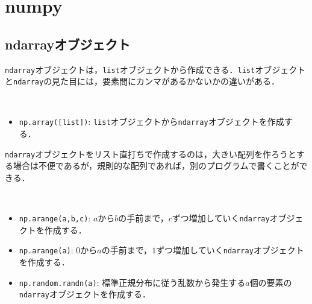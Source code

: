 \section{numpy}

\subsection{ndarrayオブジェクト}

\texttt{ndarray}オブジェクトは，\texttt{list}オブジェクトから作成できる．\texttt{list}オブジェクトと\texttt{ndarray}の見た目には，要素間にカンマがあるかないかの違いがある．

\begin{gram}　
\begin{itemize}
\item \texttt{np.array([list])}: \texttt{list}オブジェクトから\texttt{ndarray}オブジェクトを作成する．
\end{itemize}
\end{gram}

\begin{cod}[\texttt{num1.py}]　
}]{code/num1.py}
\vspace{-7pt}
\begin{lstlisting}
x=[1 2 3]
y=[4 5 6 7]
mylist=[4, 5, 6, 7]
\end{lstlisting}
\end{cod}
\vspace{-10pt}

\texttt{ndarray}オブジェクトをリスト直打ちで作成するのは，大きい配列を作ろうとする場合は不便であるが，規則的な配列であれば，別のプログラムで書くことができる．

\begin{gram}　
\begin{itemize}
\item \texttt{np.arange(a,b,c)}: $a$から$b$の手前まで，$c$ずつ増加していく\texttt{ndarray}オブジェクトを作成する．
\item \texttt{np.arange(a)}: $0$から$a$の手前まで，$1$ずつ増加していく\texttt{ndarray}オブジェクトを作成する．
\item \texttt{np.random.randn(a)}: 標準正規分布に従う乱数から発生する$a$個の要素の\texttt{ndarray}オブジェクトを作成する．
\end{itemize}
\end{gram}

\begin{cod}[\texttt{num2.py}]　
}]{code/num2.py}
\vspace{-10pt}
\begin{lstlisting}
x=[ 0  2  4  6  8 10 12 14 16 18 20 22 24 26 28]
y=[0 1 2 3 4 5 6 7 8 9]
z=[ 0.41391684 -0.27481322 -0.29993306 -0.64974345  0.63441892  0.66554782 -0.52705262  1.1350932  -0.6862161   1.15003734]
\end{lstlisting}
\end{cod}
\vspace{-10pt}